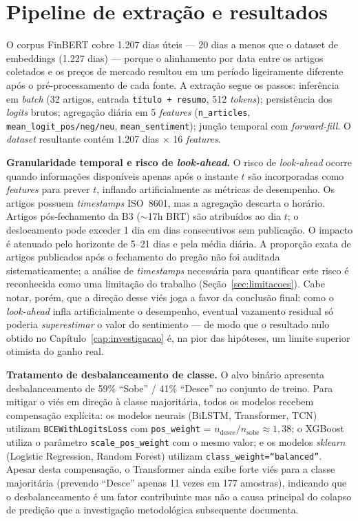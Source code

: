 \section{Pipeline de extração e resultados}

O corpus FinBERT cobre 1.207 dias úteis --- 20 dias a menos que o dataset de embeddings (1.227 dias) --- porque o alinhamento por data entre os artigos coletados e os preços de mercado resultou em um período ligeiramente diferente após o pré-processamento de cada fonte. A extração segue os passos: inferência em \textit{batch} (32 artigos, entrada \texttt{título + resumo}, 512 \textit{tokens}); persistência dos \textit{logits} brutos; agregação diária em 5 \textit{features} (\texttt{n\_articles}, \texttt{mean\_logit\_pos/\allowbreak neg/\allowbreak neu}, \texttt{mean\_sentiment}); junção temporal com \textit{forward-fill}. O \textit{dataset} resultante contém 1.207 dias $\times$ 16 \textit{features}.

\textbf{Granularidade temporal e risco de \textit{look-ahead}.} O risco de \textit{look-ahead} ocorre quando informações disponíveis apenas após o instante $t$ são incorporadas como \textit{features} para prever $t$, inflando artificialmente as métricas de desempenho. Os artigos possuem \textit{timestamps} ISO~8601, mas a agregação descarta o horário. Artigos pós-fechamento da B3 ($\sim$17h BRT) são atribuídos ao dia $t$; o deslocamento pode exceder 1 dia em dias consecutivos sem publicação. O impacto é atenuado pelo horizonte de 5--21 dias e pela média diária. A proporção exata de artigos publicados após o fechamento do pregão não foi auditada sistematicamente; a análise de \textit{timestamps} necessária para quantificar este risco é reconhecida como uma limitação do trabalho (Seção~\ref{sec:limitacoes}). Cabe notar, porém, que a direção desse viés joga a favor da conclusão final: como o \textit{look-ahead} infla artificialmente o desempenho, eventual vazamento residual só poderia \emph{superestimar} o valor do sentimento --- de modo que o resultado nulo obtido no Capítulo~\ref{cap:investigacao} é, na pior das hipóteses, um limite superior otimista do ganho real.

\textbf{Tratamento de desbalanceamento de classe.} O alvo binário apresenta desbalanceamento de 59\% ``Sobe'' / 41\% ``Desce'' no conjunto de treino. Para mitigar o viés em direção à classe majoritária, todos os modelos recebem compensação explícita: os modelos neurais (BiLSTM, Transformer, TCN) utilizam \texttt{BCEWithLogitsLoss} com \texttt{pos\_weight} = $n_\text{desce} / n_\text{sobe} \approx 1{,}38$; o XGBoost utiliza o parâmetro \texttt{scale\_pos\_weight} com o mesmo valor; e os modelos \textit{sklearn} (Logistic Regression, Random Forest) utilizam \texttt{class\_weight=``balanced''}. Apesar desta compensação, o Transformer ainda exibe forte viés para a classe majoritária (prevendo ``Desce'' apenas 11 vezes em 177 amostras), indicando que o desbalanceamento é um fator contribuinte mas não a causa principal do colapso de predição que a investigação metodológica subsequente documenta.

